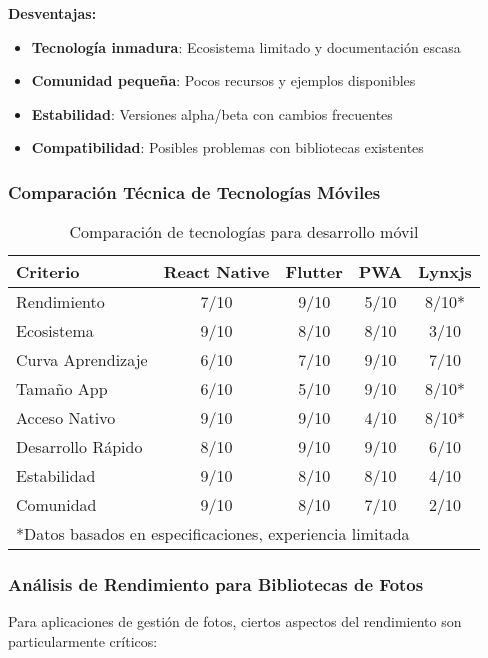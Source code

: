 \textbf{Desventajas:}
\begin{itemize}
    \item \textbf{Tecnología inmadura}: Ecosistema limitado y documentación escasa
    \item \textbf{Comunidad pequeña}: Pocos recursos y ejemplos disponibles
    \item \textbf{Estabilidad}: Versiones alpha/beta con cambios frecuentes
    \item \textbf{Compatibilidad}: Posibles problemas con bibliotecas existentes
\end{itemize}

\subsubsection{Comparación Técnica de Tecnologías Móviles}

\begin{table}[h]
\centering
\begin{tabular}{|l|c|c|c|c|}
\hline
\textbf{Criterio} & \textbf{React Native} & \textbf{Flutter} & \textbf{PWA} & \textbf{Lynxjs} \\
\hline
Rendimiento & 7/10 & 9/10 & 5/10 & 8/10* \\
Ecosistema & 9/10 & 8/10 & 8/10 & 3/10 \\
Curva Aprendizaje & 6/10 & 7/10 & 9/10 & 7/10 \\
Tamaño App & 6/10 & 5/10 & 9/10 & 8/10* \\
Acceso Nativo & 9/10 & 9/10 & 4/10 & 8/10* \\
Desarrollo Rápido & 8/10 & 9/10 & 9/10 & 6/10 \\
Estabilidad & 9/10 & 8/10 & 8/10 & 4/10 \\
Comunidad & 9/10 & 8/10 & 7/10 & 2/10 \\
\hline
\multicolumn{5}{|l|}{*Datos basados en especificaciones, experiencia limitada} \\
\hline
\end{tabular}
\caption{Comparación de tecnologías para desarrollo móvil}
\label{tab:mobile_tech_comparison}
\end{table}

\subsubsection{Análisis de Rendimiento para Bibliotecas de Fotos}

Para aplicaciones de gestión de fotos, ciertos aspectos del rendimiento son particularmente críticos:

